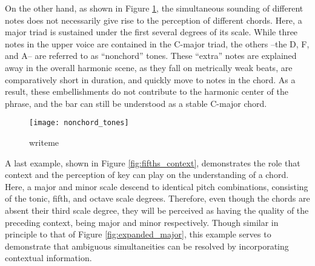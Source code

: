 On the other hand, as shown in Figure \ref{fig:nonchord_tones}, the simultaneous sounding of different notes does not necessarily give rise to the perception of different chords.
Here, a major triad is sustained under the first several degrees of its scale.
While three notes in the upper voice are contained in the C-major triad, the others --the D, F, and A-- are referred to as ``nonchord'' tones.
These ``extra'' notes are explained away in the overall harmonic scene, as they fall on metrically weak beats, are comparatively short in duration, and quickly move to notes in the chord.
As a result, these embellishments do not contribute to the harmonic center of the phrase, and the bar can still be understood as a stable C-major chord.


\begin{figure}[t]
\centering
\texttt{[image: nonchord\_tones]}
\caption{writeme}
\label{fig:nonchord_tones}
\end{figure}

A last example, shown in Figure \ref{fig:fifths_context}, demonstrates the role that context and the perception of key can play on the understanding of a chord.
Here, a major and minor scale descend to identical pitch combinations, consisting of the tonic, fifth, and octave scale degrees.
Therefore, even though the chords are absent their third scale degree, they will be perceived as having the quality of the preceding context, being major and minor respectively.
Though similar in principle to that of Figure \ref{fig:expanded_major}, this example serves to demonstrate that ambiguous simultaneities can be resolved by incorporating contextual information.




